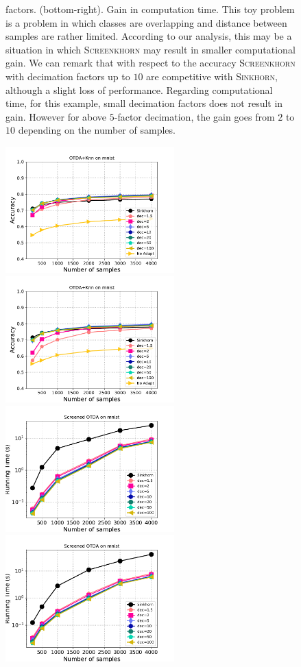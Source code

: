 \begin{figure}[htbp]
{	factors. (bottom-right). Gain in computation time. This toy problem is a problem in which classes are overlapping and distance between samples are rather limited. According to our analysis, this may be a situation in which \textsc{Screenkhorn} may
	result in smaller computational gain. We can remark that with respect to the accuracy
	\textsc{Screenkhorn} with decimation factors up to $10$ are competitive with \textsc{Sinkhorn}, although a slight loss of performance. Regarding computational time, for this example, small decimation factors does not  result in gain. However for above  $5$-factor decimation, the gain goes from  $2$ to $10$ depending on
	the number of samples. 
	\label{fig:otda:extra}}
\end{figure}


\begin{figure}[htbp]
	\centering
	\includegraphics[width=6.5cm]{./figs/da_accur_mnist_regcl1.pdf}
	\includegraphics[width=6.5cm]{./figs/da_accur_mnist_regcl10.pdf}
	\includegraphics[width=6.5cm]{./figs/da_time_mnist_regcl1.pdf}
	\includegraphics[width=6.5cm]{./figs/da_time_mnist_regcl10.pdf}

\end{figure}
